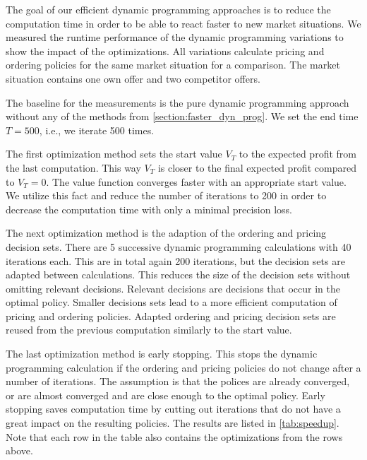 The goal of our efficient dynamic programming approaches is to reduce the computation time in order to be able to react faster to new market situations.
We measured the runtime performance of the dynamic programming variations to show the impact of the optimizations.
All variations calculate pricing and ordering policies for the same market situation for a comparison.
The market situation contains one own offer and two competitor offers.

The baseline for the measurements is the pure dynamic programming approach without any of the methods from \cref{section:faster_dyn_prog}.
We set the end time $T = 500$, i.e., we iterate 500 times.

The first optimization method sets the start value $V_T$ to the expected profit from the last computation.
This way $V_T$ is closer to the final expected profit compared to $V_T = 0$.
The value function converges faster with an appropriate start value.
We utilize this fact and reduce the number of iterations to 200 in order to decrease the computation time with only a minimal precision loss.

The next optimization method is the adaption of the ordering and pricing decision sets.
There are 5 successive dynamic programming calculations with 40 iterations each.
This are in total again 200 iterations, but the decision sets are adapted between calculations.
This reduces the size of the decision sets without omitting relevant decisions.
Relevant decisions are decisions that occur in the optimal policy.
Smaller decisions sets lead to a more efficient computation of pricing and ordering policies.
Adapted ordering and pricing decision sets are reused from the previous computation similarly to the start value.

The last optimization method is early stopping.
This stops the dynamic programming calculation if the ordering and pricing policies do not change after a number of iterations.
The assumption is that the polices are already converged, or are almost converged and are close enough to the optimal policy.
Early stopping saves computation time by cutting out iterations that do not have a great impact on the resulting policies.
The results are listed in \cref{tab:speedup}.
Note that each row in the table also contains the optimizations from the rows above.

